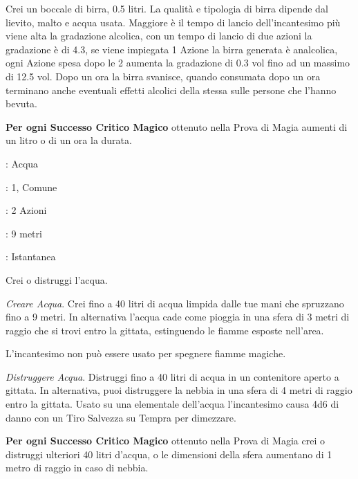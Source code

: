 \begin{multicols}{2}
Crei un boccale di birra, 0.5 litri. La qualità e tipologia di birra dipende dal lievito, malto e acqua usata.
Maggiore è il tempo di lancio dell'incantesimo più viene alta la gradazione alcolica, con un tempo di lancio di due azioni la gradazione è di 4.3, se viene impiegata 1 Azione la birra generata è analcolica, ogni Azione spesa dopo le 2 aumenta la gradazione di 0.3 vol fino ad un massimo di 12.5 vol.
Dopo un ora la birra svanisce, quando consumata dopo un ora terminano anche eventuali effetti alcolici della stessa sulle persone che l'hanno bevuta.

\textbf{Per ogni Successo Critico Magico} ottenuto nella Prova di Magia aumenti di un litro o di un ora la durata.

\noindent\colorbox{OBSSgold!10}{
\begin{minipage}{0.95\linewidth}
\begin{description}[noitemsep, topsep=0pt, parsep=0pt, partopsep=0pt, leftmargin=0cm, labelwidth=1.3cm]
	\item[\textbf{Lista}]: Acqua
	\item[\textbf{Livello}]: 1, Comune
	\item[\textbf{Lancio}]: 2 Azioni
	\item[\textbf{Gittata}]: 9 metri
	\item[\textbf{Durata}]: Istantanea
\end{description}
\end{minipage}}\smallskip

Crei o distruggi l'acqua.

\emph{Creare Acqua}. Crei fino a 40 litri di acqua limpida dalle tue mani che spruzzano fino a 9 metri. In alternativa l'acqua cade come pioggia in una sfera di 3 metri di raggio che si trovi entro la gittata, estinguendo le fiamme esposte nell'area.

L'incantesimo non può essere usato per spegnere fiamme magiche.

\emph{Distruggere Acqua}. Distruggi fino a 40 litri di acqua in un contenitore aperto a gittata. In alternativa, puoi distruggere la nebbia in una sfera di 4 metri di raggio entro la gittata. Usato su una elementale dell'acqua l'incantesimo causa 4d6 di danno con un Tiro Salvezza su Tempra per dimezzare.

\textbf{Per ogni Successo Critico Magico} ottenuto nella Prova di Magia crei o distruggi ulteriori 40 litri d'acqua, o le dimensioni della sfera aumentano di 1 metro di raggio in caso di nebbia.


\end{multicols}
